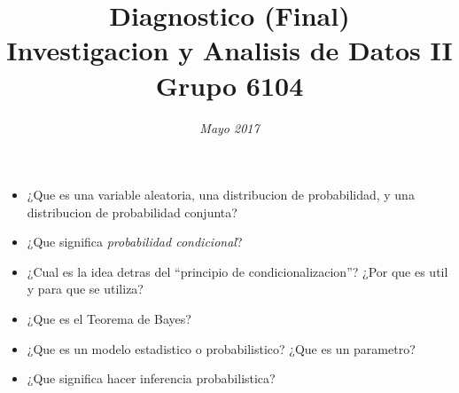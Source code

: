\documentclass{article}
\begin{document}
\title{\huge Diagnostico (Final) \\
\Large Investigacion y Analisis de Datos II \\
Grupo 6104
}
\date{\emph{Mayo 2017}}
\maketitle{}
\begin{itemize}
\item{¿Que es una variable aleatoria, una distribucion de probabilidad, y una distribucion de probabilidad conjunta?}
\item{¿Que significa \emph{probabilidad condicional}?}
\item{¿Cual es la idea detras del ``principio de condicionalizacion''? ¿Por que es util y para que se utiliza?}
\item{¿Que es el Teorema de Bayes?}
\item{¿Que es un modelo estadistico o probabilistico? ¿Que es un parametro?}
\item{¿Que significa hacer inferencia probabilistica?}
\end{itemize}
\end{document}
